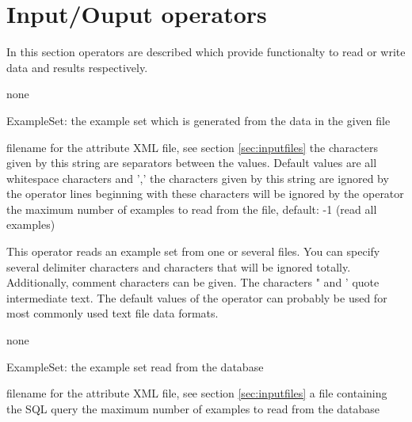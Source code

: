 \section{Input/Ouput operators}
\label{sec:inoutoperators}

In this section operators are described which provide functionalty to
read or write data and results respectively. 



\begin{opin}
\item none
\end{opin}

\begin{opout}
\item[ExampleSet:] the example set which is generated from the data in
  the given file
\end{opout}


\begin{parameters}
\reqpar[attributes] filename for the attribute {XML} file, see
  section \ref{sec:inputfiles}
 the characters given by this string are
  separators between the values. Default values are all whitespace
  characters and ','
 the characters given by this string are ignored
  by the operator
 lines beginning with these characters will be
  ignored by the operator
 the maximum number of examples to read from the
  file, default: -1 (read all examples)
\end{parameters}

\opdescr This operator reads an example set from one or several
files. You can specify several delimiter characters and characters that 
will be ignored totally. Additionally, comment characters can be given. 
The characters " and ' quote intermediate text. The default values of the 
 operator can probably be used for most commonly used text file data formats.



\begin{opin}
\item none
\end{opin}

\begin{opout}
\item[ExampleSet:] the example set read from the database
\end{opout}

\begin{parameters}
\reqpar[attributes] filename for the attribute {XML} file, see
  section \ref{sec:inputfiles}
 a file containing the {SQL} query
 the maximum number of examples to read from the
  database
\end{parameters}


